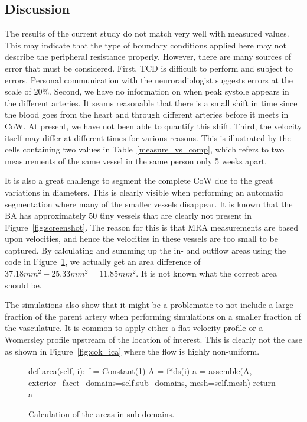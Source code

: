 \subsection{Discussion}

The results of the current study do not match very well with measured
values. This may indicate that the type of boundary conditions applied
here may not describe the peripheral resistance properly. However,
there are many sources of error that must be considered.  First, TCD
is difficult to perform and subject to errors. Personal communication
with the neuroradiologist suggests errors at the scale of 20\%.
Second, we have no information on when peak systole appears in the
different arteries. It seams reasonable that there is a small shift in
time since the blood goes from the heart and through different
arteries before it meets in CoW. At present, we have not been able to
quantify this shift. Third, the velocity itself may differ at
different times for various reasons. This is illustrated by the cells
containing two values in Table~\ref{measure_vs_comp}, which refers to
two measurements of the same vessel in the same person only 5 weeks
apart.

It is also a great challenge to segment the complete CoW due to the
great variations in diameters. This is clearly visible when performing
an automatic segmentation where many of the smaller vessels disappear.
It is known that the BA has approximately 50 tiny vessels that are
clearly not present in Figure~\ref{fig:screenshot}. The reason for
this is that MRA measurements are based upon velocities, and hence the
velocities in these vessels are too small to be captured. By
calculating and summing up the in- and outflow areas using the code in
Figure~\ref{fig:area_code}, we actually get an area difference of
$37.18mm^2-25.33mm^2=11.85mm^2$. It is not known what the correct area
should be.

The simulations also show that it might be a problematic to not
include a large fraction of the parent artery when performing
simulations on a smaller fraction of the vasculature. It is common to
apply either a flat velocity profile or a Womersley profile upstream
of the location of interest. This is clearly not the case as shown in
Figure~\ref{fig:cok_ica} where the flow is highly non-uniform.

\begin{figure}
  \codesize
  \begin{center}
    \begin{python}
def area(self, i):
    f = Constant(1)
    A = f*ds(i)
    a = assemble(A, exterior_facet_domains=self.sub_domains, mesh=self.mesh)
    return a
    \end{python}
    \caption{Calculation of the areas in sub domains.}
    \label{fig:area_code}
  \end{center}
\end{figure}

